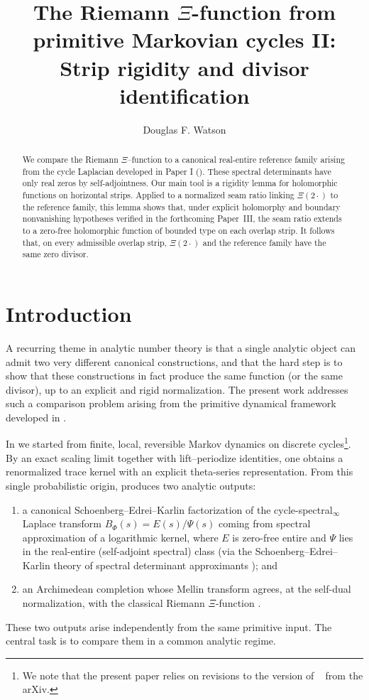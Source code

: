 \documentclass[11pt]{amsart}
\title[The Riemann $\Xi$-function from primitive Markovian cycles II]{The Riemann $\Xi$-function from primitive Markovian cycles II: Strip rigidity and divisor identification}
\author{
Douglas F. Watson
}
\date{}
\theoremstyle{definition}
\theoremstyle{remark}
\begin{document}
\begin{abstract}
We compare the Riemann $\Xi$--function to a canonical real-entire reference family arising from the
cycle Laplacian developed in Paper I (\cite{PaperI}).  These spectral determinants have only real zeros by
self-adjointness.  Our main tool is a rigidity lemma for holomorphic functions on horizontal strips.
Applied to a normalized seam ratio linking $\Xi(2\cdot)$ to the reference family, this lemma shows
that, under explicit holomorphy and boundary nonvanishing hypotheses verified in the forthcoming Paper~III, the seam
ratio extends to a zero-free holomorphic function of bounded type on each overlap strip.  It follows
that, on every admissible overlap strip, $\Xi(2\cdot)$ and the reference family have the same zero
divisor.
\end{abstract}








\maketitle



\section{Introduction}
\label{sec:background}

A recurring theme in analytic number theory is that a single analytic object can admit
two very different canonical constructions, and that the hard step is to show that these
constructions in fact produce the same function (or the same divisor), up to an
explicit and rigid normalization. The present work addresses such a comparison problem
arising from the primitive dynamical framework developed in \cite{PaperI}.


In \cite{PaperI} we started from finite, local, reversible Markov dynamics on discrete cycles\footnote{We note that the present paper relies on revisions to the version of ~\cite{PaperI} from the arXiv.}.
By an exact scaling limit together with lift--periodize identities, one obtains a renormalized
trace kernel with an explicit theta-series representation. From this single probabilistic
origin, \cite{PaperI} produces two analytic outputs:
\begin{enumerate}
\item a canonical Schoenberg--Edrei--Karlin factorization of the cycle-spectral$_\infty$ Laplace transform
\(
B_\Phi(s)=E(s)/\Psi(s)
\)
coming from spectral approximation of a logarithmic kernel, where $E$ is zero-free entire and
$\Psi$ lies in the real-entire (self-adjoint spectral) class (via the Schoenberg--Edrei--Karlin theory of
spectral determinant approximants \cite{Karlin1968}); and
\item an Archimedean completion whose Mellin transform agrees, at the self-dual normalization,
with the classical Riemann $\Xi$-function \cite{Titchmarsh1986}.
\end{enumerate}
These two outputs arise independently from the same primitive input. The central task is to
compare them in a common analytic regime.
\end{document}
